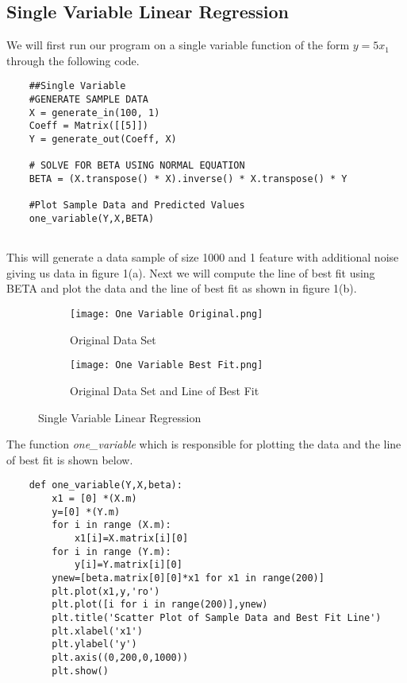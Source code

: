 \subsection{Single Variable Linear Regression}
We will first run our program on a single variable function of the form $y=5x_1$ through the following code.
\begin{lstlisting}
    ##Single Variable
    #GENERATE SAMPLE DATA
    X = generate_in(100, 1)
    Coeff = Matrix([[5]])
    Y = generate_out(Coeff, X)
    
    # SOLVE FOR BETA USING NORMAL EQUATION
    BETA = (X.transpose() * X).inverse() * X.transpose() * Y
    
    #Plot Sample Data and Predicted Values
    one_variable(Y,X,BETA)
    
\end{lstlisting}
This will generate a data sample of size 1000 and 1 feature with additional noise giving us data in figure 1(a). Next we will compute the line of best fit using BETA and plot the data and the line of best fit as shown in figure 1(b).   

\begin{figure}[h!]
    \centering
    \begin{subfigure}{0.5\textwidth}
        \centering
        \texttt{[image: One Variable Original.png]}
        \caption{Original Data Set}
    \end{subfigure}%
    \begin{subfigure}{0.5\textwidth}
        \centering
        \texttt{[image: One Variable Best Fit.png]}
        \caption{Original Data Set and Line of Best Fit} 
    \end{subfigure}
    \caption{Single Variable Linear Regression}
\end{figure} 
\noindent The function \textit{one\_variable} which is responsible for plotting the data and the line of best fit is shown below.
\begin{lstlisting}
    def one_variable(Y,X,beta):
        x1 = [0] *(X.m)
        y=[0] *(Y.m)
        for i in range (X.m):
            x1[i]=X.matrix[i][0]
        for i in range (Y.m):
            y[i]=Y.matrix[i][0]
        ynew=[beta.matrix[0][0]*x1 for x1 in range(200)]
        plt.plot(x1,y,'ro')
        plt.plot([i for i in range(200)],ynew)
        plt.title('Scatter Plot of Sample Data and Best Fit Line')
        plt.xlabel('x1')
        plt.ylabel('y')
        plt.axis((0,200,0,1000))
        plt.show()
\end{lstlisting}


